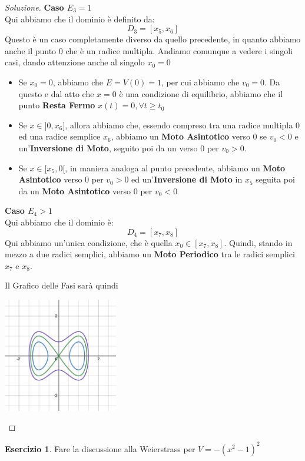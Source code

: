 \documentclass[11pt,a4paper,twoside]{article}
\theoremstyle{definition}
\newtheorem{ese}{Esercizio}[section]
\newenvironment{sol}
	{\renewcommand\qedsymbol{$\blacksquare$}\begin{proof}[Soluzione]}
	{\end{proof}}
\begin{document}
\begin{sol}
	\textbf{Caso $E_3= 1$}\\
	Qui abbiamo che il dominio è definito da:
	\[ D_3 = [x_5,x_6] \]
	Questo è un caso completamente diverso da quello precedente, in quanto abbiamo anche il punto $0$ che è un radice multipla. Andiamo comunque a vedere i singoli casi, dando attenzione anche al singolo $x_0 = 0$
	\begin{itemize}
		\item Se $x_0 = 0$, abbiamo che $E = V(0) = 1$, per cui abbiamo che $v_0 = 0$. Da questo e dal atto che $x=0$ è una condizione di equilibrio, abbiamo che il punto \textbf{Resta Fermo} $x(t) = 0, \forall t \geq t_0$
		\item Se $x \in ]0, x_6]$, allora abbiamo che, essendo compreso tra una radice multipla $0$ ed una radice semplice $x_6$, abbiamo un \textbf{Moto Asintotico} verso $0$ se $v_0<0$ e un'\textbf{Inversione di Moto}, seguito poi da un  verso $0$ per $v_0>0$.
		\item Se $x \in [x_5,0[$, in maniera analoga al punto precedente, abbiamo un \textbf{Moto Asintotico} verso $0$ per $v_0>0$ ed un'\textbf{Inversione di Moto} in $x_5$ seguita poi da un \textbf{Moto Asintotico} verso $0$ per $v_0<0$
	\end{itemize}

	\textbf{Caso $E_4>1$}\\
	Qui abbiamo che il dominio è:
	\[ D_4 = [x_7, x_8] \]
	Qui abbiamo un'unica condizione, che è quella $x_0 \in [x_7, x_8]$. Quindi, stando in mezzo a due radici semplici, abbiamo un \textbf{Moto Periodico} tra le radici semplici $x_7$ e $x_8$.

	Il Grafico delle Fasi sarà quindi

	\begin{center}
		\includegraphics[height=5cm]{Grafico2}
	\end{center}
\end{sol}

\begin{ese}
	Fare la discussione alla Weierstrass per $V = -(x^2-1)^2$
\end{ese}
\end{document}
